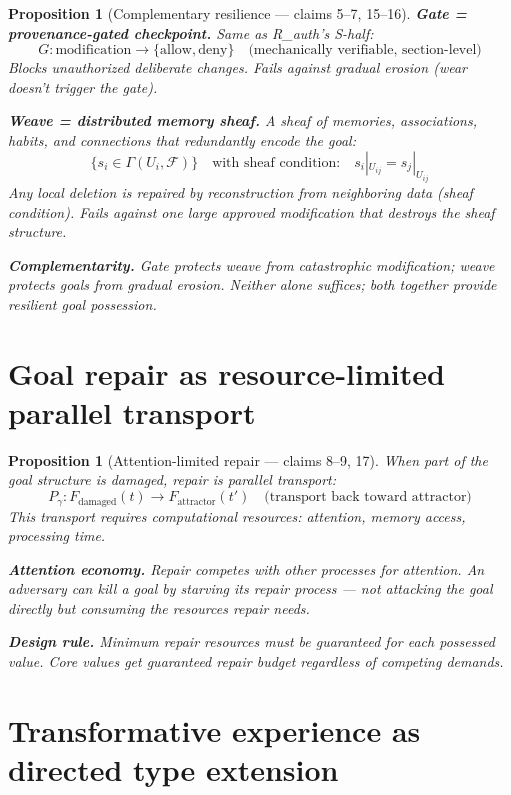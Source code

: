 \documentclass[11pt,a4paper]{article}
\newtheorem{proposition}[definition]{Proposition}
\begin{document}
\begin{proposition}[Complementary resilience --- claims 5--7, 15--16]
\label{prop:gate_weave}
\textbf{Gate = provenance-gated checkpoint.} Same as R\_auth's S-half:
\[
  G: \text{modification} \to \{\text{allow}, \text{deny}\}
  \quad \text{(mechanically verifiable, section-level)}
\]
Blocks unauthorized deliberate changes. Fails against gradual erosion
(wear doesn't trigger the gate).

\textbf{Weave = distributed memory sheaf.} A sheaf of memories,
associations, habits, and connections that redundantly encode the goal:
\[
  \{s_i \in \Gamma(U_i, \mathcal{F})\} \quad \text{with sheaf condition:}
  \quad s_i|_{U_{ij}} = s_j|_{U_{ij}}
\]
Any local deletion is repaired by reconstruction from neighboring data
(sheaf condition). Fails against one large approved modification that
destroys the sheaf structure.

\textbf{Complementarity.} Gate protects weave from catastrophic
modification; weave protects goals from gradual erosion. Neither alone
suffices; both together provide resilient goal possession.
\end{proposition}

\section{Goal repair as resource-limited parallel transport}

\begin{proposition}[Attention-limited repair --- claims 8--9, 17]
\label{prop:repair}
When part of the goal structure is damaged, repair is parallel transport:
\[
  P_\gamma: F_{\text{damaged}}(t) \to F_{\text{attractor}}(t')
  \quad \text{(transport back toward attractor)}
\]
This transport requires computational resources: attention, memory
access, processing time.

\textbf{Attention economy.} Repair competes with other processes for
attention. An adversary can kill a goal by starving its repair process
--- not attacking the goal directly but consuming the resources repair
needs.

\textbf{Design rule.} Minimum repair resources must be guaranteed for
each possessed value. Core values get guaranteed repair budget regardless
of competing demands.
\end{proposition}

\section{Transformative experience as directed type extension}
\end{document}
